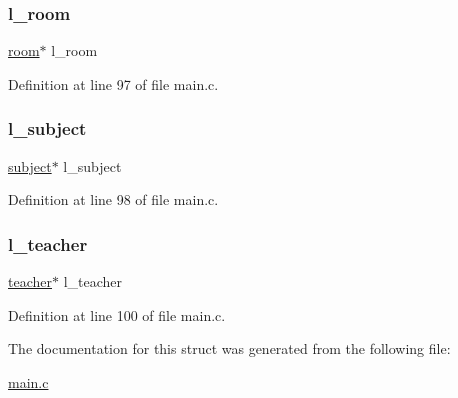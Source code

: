 \hypertarget{structlecture_ac9357ac63b26ca97ed45bca4e1b7134c}{}\label{structlecture_ac9357ac63b26ca97ed45bca4e1b7134c} 
\subsubsection{\texorpdfstring{l\+\_\+room}{l\_room}}
{\footnotesize\ttfamily \hyperlink{structroom}{room}$\ast$ l\+\_\+room}



Definition at line 97 of file main.\+c.

\hypertarget{structlecture_a104b8fe6246b0cdbadf51b2c4b718002}{}\label{structlecture_a104b8fe6246b0cdbadf51b2c4b718002} 
\subsubsection{\texorpdfstring{l\+\_\+subject}{l\_subject}}
{\footnotesize\ttfamily \hyperlink{structsubject}{subject}$\ast$ l\+\_\+subject}



Definition at line 98 of file main.\+c.

\hypertarget{structlecture_a4299a0a67212d8dd0ed38c7fc5a9d3eb}{}\label{structlecture_a4299a0a67212d8dd0ed38c7fc5a9d3eb} 
\subsubsection{\texorpdfstring{l\+\_\+teacher}{l\_teacher}}
{\footnotesize\ttfamily \hyperlink{structteacher}{teacher}$\ast$ l\+\_\+teacher}



Definition at line 100 of file main.\+c.



The documentation for this struct was generated from the following file\+:\begin{DoxyCompactItemize}
\item 
\hyperlink{main_8c}{main.\+c}\end{DoxyCompactItemize}
